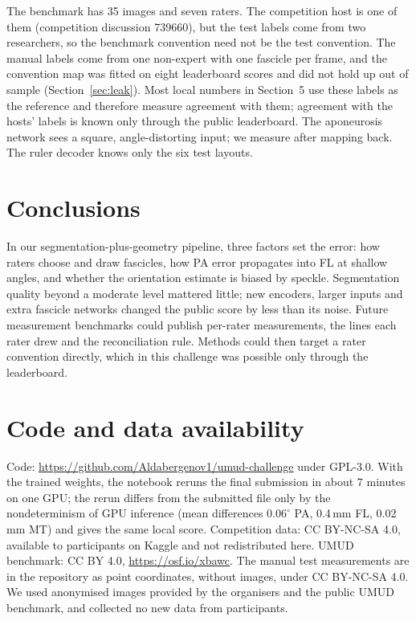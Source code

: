\documentclass[11pt,a4paper]{article}
\begin{document}
The benchmark has 35 images and seven raters. The competition host is one of them (competition discussion 739660), but the test labels come from two researchers, so the benchmark convention need not be the test convention. The manual labels come from one non-expert with one fascicle per frame, and the convention map was fitted on eight leaderboard scores and did not hold up out of sample (Section~\ref{sec:leak}). Most local numbers in Section~5 use these labels as the reference and therefore measure agreement with them; agreement with the hosts' labels is known only through the public leaderboard. The aponeurosis network sees a square, angle-distorting input; we measure after mapping back. The ruler decoder knows only the six test layouts.

\section{Conclusions}

In our segmentation-plus-geometry pipeline, three factors set the error: how raters choose and draw fascicles, how PA error propagates into FL at shallow angles, and whether the orientation estimate is biased by speckle. Segmentation quality beyond a moderate level mattered little; new encoders, larger inputs and extra fascicle networks changed the public score by less than its noise. Future measurement benchmarks could publish per-rater measurements, the lines each rater drew and the reconciliation rule. Methods could then target a rater convention directly, which in this challenge was possible only through the leaderboard.

\section*{Code and data availability}

Code: \url{https://github.com/Aldabergenov1/umud-challenge} under GPL-3.0. With the trained weights, the notebook reruns the final submission in about 7 minutes on one GPU; the rerun differs from the submitted file only by the nondeterminism of GPU inference (mean differences $0.06^\circ$ PA, 0.4\,mm FL, 0.02\,mm MT) and gives the same local score. Competition data: CC BY-NC-SA 4.0, available to participants on Kaggle and not redistributed here. UMUD benchmark: CC BY 4.0, \url{https://osf.io/xbawc}. The manual test measurements are in the repository as point coordinates, without images, under CC BY-NC-SA 4.0. We used anonymised images provided by the organisers and the public UMUD benchmark, and collected no new data from participants.



\end{document}
